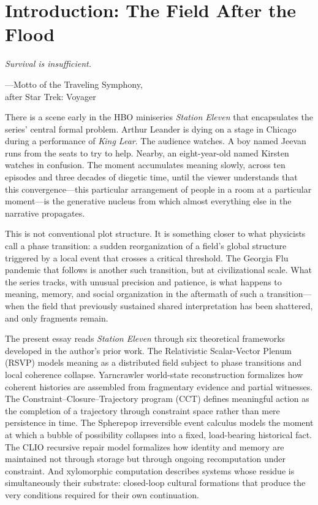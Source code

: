 \documentclass[12pt, oneside]{article}
\theoremstyle{plain}
\theoremstyle{definition}
\theoremstyle{remark}
\begin{document}
\newpage
\tableofcontents
\newpage

\section{Introduction: The Field After the Flood}

\epigraph{\textit{Survival is insufficient.}}{---Motto of the Traveling Symphony,\\
after Star Trek: Voyager}

There is a scene early in the HBO miniseries \textit{Station Eleven}
that encapsulates the series' central formal problem. Arthur Leander
is dying on a stage in Chicago during a performance of \textit{King
Lear}. The audience watches. A boy named Jeevan runs from the seats to
try to help. Nearby, an eight-year-old named Kirsten watches in
confusion. The moment accumulates meaning slowly, across ten
episodes and three decades of diegetic time, until the viewer
understands that this convergence---this particular arrangement of
people in a room at a particular moment---is the generative nucleus
from which almost everything else in the narrative propagates.

This is not conventional plot structure. It is something closer to what
physicists call a phase transition: a sudden reorganization of a
field's global structure triggered by a local event that crosses a
critical threshold. The Georgia Flu pandemic that follows is another
such transition, but at civilizational scale. What the series tracks,
with unusual precision and patience, is what happens to meaning, memory,
and social organization in the aftermath of such a transition---when
the field that previously sustained shared interpretation has been
shattered, and only fragments remain.

The present essay reads \textit{Station Eleven} through six
theoretical frameworks developed in the author's prior work. The
Relativistic Scalar-Vector Plenum (RSVP) models meaning as a
distributed field subject to phase transitions and local coherence
collapse. Yarncrawler world-state reconstruction formalizes how
coherent histories are assembled from fragmentary evidence and
partial witnesses. The Constraint--Closure--Trajectory program
(CCT) defines meaningful action as the completion of a trajectory
through constraint space rather than mere persistence in time. The
Spherepop irreversible event calculus models the moment at which a
bubble of possibility collapses into a fixed, load-bearing
historical fact. The CLIO recursive repair model formalizes how
identity and memory are maintained not through storage but through
ongoing recomputation under constraint. And xylomorphic computation
describes systems whose residue is simultaneously their substrate:
closed-loop cultural formations that produce the very conditions
required for their own continuation.
\end{document}
